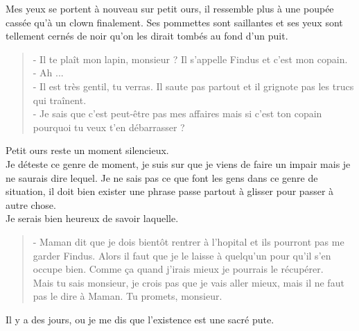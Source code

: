 Mes yeux se portent à nouveau sur petit ours, il ressemble plus à une poupée cassée qu'à un clown finalement. Ses pommettes sont saillantes et ses yeux sont tellement cernés de noir qu'on les dirait tombés au fond d'un puit. \\

\begin{quote}
- Il te plaît mon lapin, monsieur ? Il s'appelle Findus et c'est mon copain. \\
- Ah ... \\
- Il est très gentil, tu verras. Il saute pas partout et il grignote pas les trucs qui traînent. \\
- Je sais que c'est peut-être pas mes affaires mais si c'est ton copain pourquoi tu veux t'en débarrasser ? \\
\end{quote}

Petit ours reste un moment silencieux. \\
Je déteste ce genre de moment, je suis sur que je viens de faire un impair mais je ne saurais dire lequel. Je ne sais pas ce que font les gens dans ce genre de situation, il doit bien exister une phrase passe partout à glisser pour passer à autre chose.\\
Je serais bien heureux de savoir laquelle. \\

\begin{quote}
- Maman dit que je dois bientôt rentrer à l'hopital et ils pourront pas me garder Findus. Alors il faut que je le laisse à quelqu'un pour qu'il s'en occupe bien. Comme ça quand j'irais mieux je pourrais le récupérer. \\
Mais tu sais monsieur, je crois pas que je vais aller mieux, mais il ne faut pas le dire à Maman. Tu promets, monsieur.
\end{quote}

Il y a des jours, ou je me dis que l'existence est une sacré pute.
